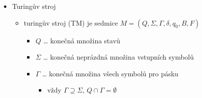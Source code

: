 \begin{itemize}
\begin{itemize}
\item o bezkontextové gramatice $G=(V,T,P,S)$ bez zbytečných symbolů, kde jsou všechna pravidla ve tvaru $A\to BC$ nebo $A\to a$, kde $A,B,C\in V,\, a\in T$, říkáme, že je v Chomského normálním tvaru (ChNF)
\item algoritmus převodu
\begin{itemize}
\item eliminujeme $\epsilon$-pravidla
\begin{itemize}
\item označíme nulovatelné symboly
\item přidáme verzi pravidel bez nulovatelných symbolů
\item odstraníme $\epsilon$-pravidla
\end{itemize}
\item eliminujeme jednotková pravidla (tím nepřidáme $\epsilon$-pravidla)
\begin{itemize}
\item najdeme jednotkové páry
\item přidáme odpovídající pravidla
\item odstraníme jednotková pravidla
\end{itemize}
\item eliminujeme zbytečné symboly (tím nepřidáme žádná pravidla)
\begin{itemize}
\item nejdříve eliminujeme negenerující, pak nedosažitelné
\end{itemize}
\item pravé strany délky aspoň 2 předěláme na samé neterminály
\item pravé strany s aspoň třemi neterminály rozdělíme na více pravidel
\end{itemize}
\end{itemize}
\item Turingův stroj
\begin{itemize}
\item turingův stroj (TM) je sedmice $M=(Q,\Sigma,\Gamma,\delta,q_0,B,F)$
\begin{itemize}
\item $Q$ \dots{} konečná množina stavů
\item $\Sigma$ \dots{} konečná neprázdná množina vstupních symbolů
\item $\Gamma$ \dots{} konečná množina všech symbolů pro pásku
\begin{itemize}
\item vždy $\Gamma\supseteq\Sigma,\,Q\cap\Gamma=\emptyset$

\end{itemize}
\end{itemize}
\end{itemize}
\end{itemize}
